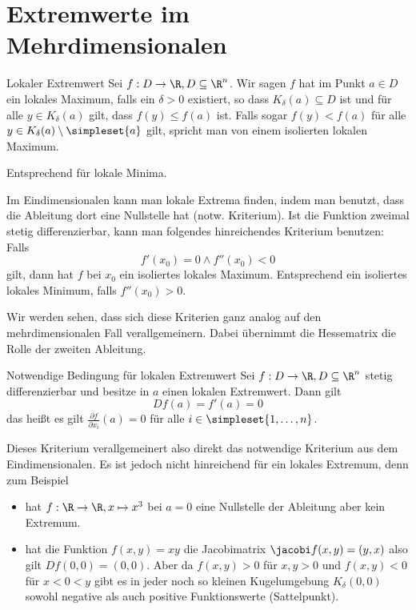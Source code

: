 \section{Extremwerte im Mehrdimensionalen}
\begin{definition}{Lokaler Extremwert}
	Sei $f:D\rightarrow \R,D\subseteq \R^n$. Wir sagen $f$ hat im Punkt $a\in D$ ein lokales Maximum, falls ein $\delta>0$ existiert, so dass $K_\delta(a)\subseteq D$ ist und für alle $y\in K_\delta(a)$ gilt, dass $f(y)\leq f(a)$ ist. Falls sogar $f(y)<f(a)$ für alle $y\in K_\delta(a)\setminus\simpleset{a}$ gilt, spricht man von einem isolierten lokalen Maximum.

	Entsprechend für lokale Minima.
\end{definition}

Im Eindimensionalen kann man lokale Extrema finden, indem man benutzt, dass die Ableitung dort eine Nullstelle hat (notw. Kriterium). Ist die Funktion zweimal stetig differenzierbar, kann man folgendes hinreichendes Kriterium benutzen: Falls
\begin{equation*}
	f'(x_0)=0 \wedge f''(x_0)<0
\end{equation*}
gilt, dann hat $f$ bei $x_0$ ein isoliertes lokales Maximum. Entsprechend ein isoliertes lokales Minimum, falls $f''(x_0)>0$.

Wir werden sehen, dass sich diese Kriterien ganz analog auf den mehrdimensionalen Fall verallgemeinern. Dabei übernimmt die Hessematrix die Rolle der zweiten Ableitung.

\begin{satz}{Notwendige Bedingung für lokalen Extremwert}
	Sei $f:D\rightarrow \R,D\subseteq \R^n$ stetig differenzierbar und besitze in $a$ einen lokalen Extremwert. Dann gilt
	\begin{equation*}
		Df(a)=f'(a)=0
	\end{equation*}
	das heißt es gilt $\frac{\partial f}{\partial x_i}(a)=0$ für alle $i\in\simpleset{1,\ldots,n}$.
\end{satz}
Dieses Kriterium verallgemeinert also direkt das notwendige Kriterium aus dem Eindimensionalen. Es ist jedoch nicht hinreichend für ein lokales Extremum, denn zum Beispiel
\begin{itemize}
	\item hat $f:\R\rightarrow\R,x\mapsto x^3$ bei $a=0$ eine Nullstelle der Ableitung aber kein Extremum.
	\item hat die Funktion $f(x,y)=xy$ die Jacobimatrix $\jacobi f(x,y)=(y,x)$ also gilt $Df(0,0)=(0,0)$. Aber da $f(x,y)>0$ für $x,y>0$ und $f(x,y)<0$ für $x<0<y$ gibt es in jeder noch so kleinen Kugelumgebung $K_\delta (0,0)$ sowohl negative als auch positive Funktionswerte (Sattelpunkt).
\end{itemize}

